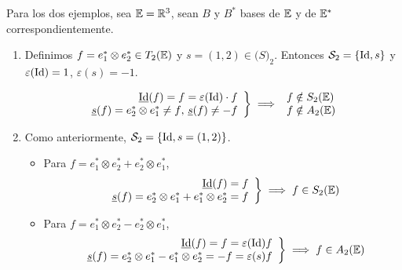 \begin{example}
   Para los dos ejemplos, sea $\mathbb{E} = \mathbb{R}^3$, sean $B$ y $B^\ast$ bases de $\mathbb{E}$ 
   y de $\mathbb{E}^\ast$ correspondientemente. 
    \begin{enumerate}
        \item
            Definimos $f = e_1^\ast \otimes e_2^\ast \in T_2(\mathbb{E})$
            y $s = (1,2) \in \mathcal(S)_2$. Entonces            
            $\mathcal{S}_2 = \left\{\operatorname{Id}, s\right\}$ y $\varepsilon(\operatorname{Id}) = 1$, 
            $\varepsilon(s) = -1$.
            
            \[
            \left.
                \begin{array}{r}
                    \underline{\operatorname{Id}}(f) = f = \varepsilon (\operatorname{Id}) \cdot f\\
                    \underline{s}(f) = e_2^\ast \otimes e_1^\ast \neq f\text{, } 
                    \underline{s}(f)\neq -f
                \end{array} 
            \right \} 
            \implies
            \begin{array}{l}
                f \notin S _2(\mathbb{E})\\
                f \notin A_2(\mathbb{E})
            \end{array}
            \]      
        \item
            Como anteriormente, $\mathcal{S}_2 = \left\{\operatorname{Id}, s = (1,2)\right\}$.
            \begin{itemize}
                \item
                    Para $f = e_1^\ast \otimes e_2^\ast + e_2^\ast \otimes e_1^\ast$, 
                    \[
                        \left.
                        \begin{array}{r}
                            \underline{\operatorname{Id}}(f) = f\\
                            \underline{s}(f) = e_2^\ast \otimes e_1^\ast
                            + e_1^\ast \otimes e_2^\ast = f
                        \end{array} 
                        \right \} 
                        \implies
                        f \in S_2(\mathbb{E})
                    \]
                \item
                    Para $f = e_1^\ast \otimes e_2^\ast - e_2^\ast \otimes e_1^\ast$, 
                    \[
                        \left.
                        \begin{array}{r}
                            \underline{\operatorname{Id}}(f) = f = \varepsilon(\operatorname{Id})f\\
                            \underline{s}(f) = e_2^\ast \otimes e_1^\ast
                            - e_1^\ast \otimes e_2^\ast = -f = \varepsilon(s)f
                        \end{array} 
                        \right \} 
                        \implies
                        f \in A_2(\mathbb{E})
                    \]
            \end{itemize}
        
    \end{enumerate}
\end{example}
